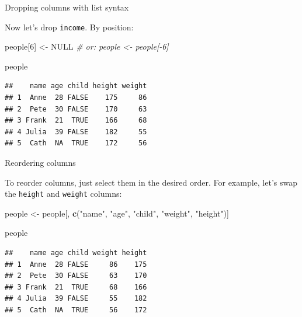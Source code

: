 \documentclass[ignorenonframetext,]{beamer}
\newenvironment{Shaded}{\begin{snugshade}}{\end{snugshade}}
\newcommand{\CommentTok}[1]{\textcolor[rgb]{0.56,0.35,0.01}{\textit{#1}}}
\newcommand{\DecValTok}[1]{\textcolor[rgb]{0.00,0.00,0.81}{#1}}
\newcommand{\KeywordTok}[1]{\textcolor[rgb]{0.13,0.29,0.53}{\textbf{#1}}}
\newcommand{\NormalTok}[1]{#1}
\newcommand{\OtherTok}[1]{\textcolor[rgb]{0.56,0.35,0.01}{#1}}
\newcommand{\StringTok}[1]{\textcolor[rgb]{0.31,0.60,0.02}{#1}}
\begin{document}
\begin{frame}[fragile]{Dropping columns with list syntax}
\protect\hypertarget{dropping-columns-with-list-syntax-1}{}

Now let's drop \texttt{income}. By position:

\begin{Shaded}
\begin{Highlighting}[]
\NormalTok{people[}\DecValTok{6}\NormalTok{] <-}\StringTok{ }\OtherTok{NULL} 
\CommentTok{# or: people <-   people[-6]}

\NormalTok{people}
\end{Highlighting}
\end{Shaded}

\begin{verbatim}
##    name age child height weight
## 1  Anne  28 FALSE    175     86
## 2  Pete  30 FALSE    170     63
## 3 Frank  21  TRUE    166     68
## 4 Julia  39 FALSE    182     55
## 5  Cath  NA  TRUE    172     56
\end{verbatim}

\end{frame}

\begin{frame}[fragile]{Reordering columns}
\protect\hypertarget{reordering-columns}{}

To reorder columns, just select them in the desired order. For example,
let's swap the \texttt{height} and \texttt{weight} columns:

\begin{Shaded}
\begin{Highlighting}[]
\NormalTok{people <-}\StringTok{ }\NormalTok{people[, }\KeywordTok{c}\NormalTok{(}\StringTok{"name"}\NormalTok{, }\StringTok{"age"}\NormalTok{, }\StringTok{"child"}\NormalTok{,  }\StringTok{"weight"}\NormalTok{, }\StringTok{"height"}\NormalTok{)]}

\NormalTok{people}
\end{Highlighting}
\end{Shaded}

\begin{verbatim}
##    name age child weight height
## 1  Anne  28 FALSE     86    175
## 2  Pete  30 FALSE     63    170
## 3 Frank  21  TRUE     68    166
## 4 Julia  39 FALSE     55    182
## 5  Cath  NA  TRUE     56    172
\end{verbatim}

\end{frame}
\end{document}
